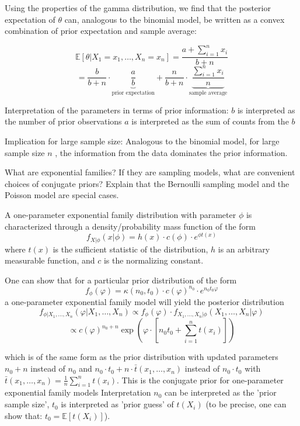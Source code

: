 Using the properties of the gamma distribution, we find that the posterior expectation of \( \theta \) can,
analogous to the binomial model, be written as a convex combination of prior expectation and sample average:

\[
\mathbb{E}[\theta | X_1 = x_1, \ldots, X_n = x_n] = \frac{a + \sum_{i=1}^n x_i}{b + n}
\]
\[
= \frac{b}{b+n} \cdot \underbrace{\frac{a}{b}}_{\text{prior expectation}} + \frac{n}{b+n} \cdot \underbrace{\frac{\sum_{i=1}^n x_i}{n}}_{\text{sample average}}
\]

Interpretation of the parameters in terms of prior information:
\( b \) is interpreted as the number of prior observations
\( a \) is interpreted as the sum of counts from the \( b \)

Implication for large sample size: Analogous to the binomial model, for large sample size \( n \) , the
information from the data dominates the prior information.

What are exponential families? If they are sampling models, what are convenient
choices of conjugate priors? Explain that the Bernoulli sampling model and the
Poisson model are special cases.

A one-parameter exponential family distribution with parameter \( \phi \) is characterized through a density/probability mass function of the form
\[
f_{X|\phi}(x|\phi) = h(x) \cdot c(\phi) \cdot e^{\phi t(x)}
\]
where \( t(x) \) is the sufficient statistic of the distribution, \( h \) is an arbitrary measurable function, 
and \( c \) is the normalizing constant.


One can show that for a particular prior distribution of the form
\[
f_{\phi}(\varphi) = \kappa(n_0, t_0) \cdot c(\varphi)^{n_0} \cdot e^{n_0 t_0 \varphi}
\]
a one-parameter exponential family model will yield the posterior distribution
\[
f_{\phi|X_1,\ldots,X_n}(\varphi|X_1,\ldots,X_n) \propto f_{\phi}(\varphi) \cdot f_{X_1,\ldots,X_n|\phi}(X_1,\ldots,X_n|\varphi)
\]
\[
\propto c(\varphi)^{n_0+n} \exp \left( \varphi \cdot \left[ n_0 t_0 + \sum_{i=1}^{n} t(x_i) \right] \right)
\]

which is of the same form as the prior distribution with updated parameters \( n_0 + n \) instead of \( n_0 \) and 
\( n_0 \cdot t_0 + n \cdot \bar{t}(x_1,\ldots,x_n) \) instead of \( n_0 \cdot t_0 \) with 
\( \bar{t}(x_1,\ldots,x_n) = \frac{1}{n} \sum_{i=1}^{n} t(x_i) \).
This is the conjugate prior for one-parameter exponential family models
Interpretation
\( n_0 \) can be interpreted as the 'prior sample size',
\( t_0 \) is interpreted as 'prior guess' of \( t(X_i) \) (to be precise, one can show that: \( t_0 = \mathbb{E}[t(X_i)] \)).

